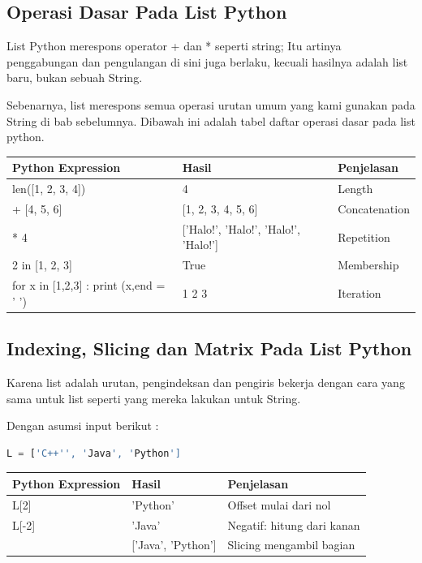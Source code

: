 \subsection{Operasi Dasar Pada List Python}
List Python merespons operator + dan * seperti string; Itu artinya penggabungan dan pengulangan di sini juga berlaku, kecuali hasilnya adalah list baru, bukan sebuah String.

Sebenarnya, list merespons semua operasi urutan umum yang kami gunakan pada String di bab sebelumnya. Dibawah ini adalah tabel daftar operasi dasar pada list python.
\begin{center}
\begin{tabular}{ | m{4cm} | m{4cm} | m{2cm} | }
\hline
Python Expression & Hasil & Penjelasan \\
\hline
len([1, 2, 3, 4]) & 4 & Length \\
\hline
[1, 2, 3] + [4, 5, 6] & [1, 2, 3, 4, 5, 6] & Concatenation \\
\hline
['Halo!'] * 4 & ['Halo!', 'Halo!', 'Halo!', 'Halo!'] & Repetition \\
\hline
2 in [1, 2, 3] & True & Membership \\
\hline
for x in [1,2,3] : print (x,end = ' ') & 1 2 3 & Iteration \\
\hline
\end{tabular}
\end{center}

\subsection{Indexing, Slicing dan Matrix Pada List Python}
Karena list adalah urutan, pengindeksan dan pengiris bekerja dengan cara yang sama untuk list seperti yang mereka lakukan untuk String.

Dengan asumsi input berikut :
\begin{lstlisting}[language=Python]
L = ['C++'', 'Java', 'Python']
\end{lstlisting}

\begin{center}
\begin{tabular}{ | m{4cm} | m{4cm} | m{2cm} | }
\hline
Python Expression & Hasil & Penjelasan \\
\hline
L[2] & 'Python' & Offset mulai dari nol \\
\hline
L[-2] & 'Java' & Negatif: hitung dari kanan \\
\hline
[1:] & ['Java', 'Python'] & Slicing mengambil bagian \\
\hline
\end{tabular}
\end{center}

